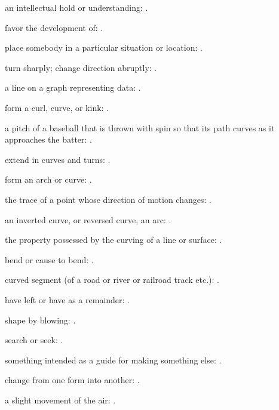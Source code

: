   an intellectual hold or understanding:   .

  favor the development of: .

  place somebody in a particular situation or location: .

  turn sharply; change direction abruptly:   .

  a line on a graph representing data: .

  form a curl, curve, or kink:   .

  a pitch of a baseball that is thrown with spin so that its path curves as it approaches the batter:   .

  extend in curves and turns:   .

  form an arch or curve:   .

  the trace of a point whose direction of motion changes:   .

  an inverted curve, or reversed curve, an arc: .

  the property possessed by the curving of a line or surface:   .

  bend or cause to bend:   .

  curved segment (of a road or river or railroad track etc.):   .

  have left or have as a remainder: .

  shape by blowing: .

  search or seek:   .

  something intended as a guide for making something else:   .

  change from one form into another: .

  a slight movement of the air: .

